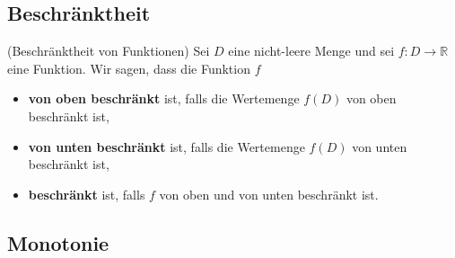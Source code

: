 \documentclass[../Analysis1_script.tex]{subfiles}
\begin{document}
\subsection{Beschränktheit}

\begin{definition}{(Beschränktheit von Funktionen)}
	Sei $D$ eine nicht-leere Menge und sei $f: D \to \mathbb {R}$ eine Funktion. Wir sagen, dass die Funktion $f$
	\begin{itemize}
		\item{\textbf{von oben beschränkt}} ist, falls die Wertemenge $f(D)$ von oben beschränkt ist, 
		\item{\textbf{von unten beschränkt}} ist, falls die Wertemenge $f(D)$ von unten beschränkt ist, 
		\item{\textbf{beschränkt}} ist, falls $f$ von oben und von unten beschränkt ist.
	\end{itemize}
\end{definition}

\subsection{Monotonie}
\end{document}
